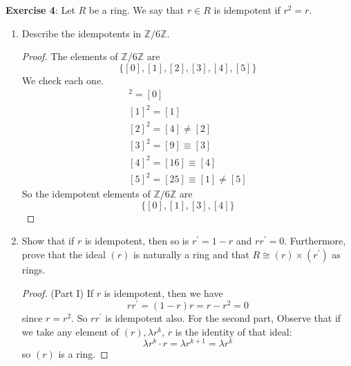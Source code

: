 \documentclass{article}
\begin{document}
\textbf{Exercise 4}: Let $R$ be a ring. We say that $r \in R$ is idempotent if $r^{2} = r$.
    \begin{enumerate}
        \item Describe the idempotents in $\mathbb{Z}/6\mathbb{Z}$.
            \begin{proof}
                The elements of $\mathbb{Z}/6\mathbb{Z}$ are 
                \begin{equation*}
                    \{[0], [1], [2], [3], [4], [5]\}
                \end{equation*}
                We check each one.
                \begin{gather*}
                    [0]^{2} = [0] \\
                    [1]^{2}  = [1] \\
                    [2]^{2} = [4] \neq [2] \\
                    [3]^{2} = [9] \equiv [3] \\
                    [4]^{2} = [16] \equiv [4] \\
                    [5]^{2} = [25] \equiv [1] \neq [5]
                \end{gather*}
                So the idempotent elements of $\mathbb{Z}/6\mathbb{Z}$ are 
                \begin{equation*}
                    \{[0], [1], [3], [4]\}
                \end{equation*}
            \end{proof}

        \item Show that if $r$ is idempotent, then so is $r^{\prime} = 1 - r$ and $rr^{\prime} = 0$. Furthermore, prove that the ideal $(r)$ is naturally a ring and that $R \cong (r) \times (r^{\prime})$ as rings.
            \begin{proof}
                (Part I) If $r$ is idempotent, then we have
                \begin{equation*}
                    rr^{\prime} = (1 - r)r = r - r^{2} = 0 
                \end{equation*}
                since $r = r^{2}$. So $rr^{\prime}$ is idempotent also. For the second part, Observe that if we take any element of $(r), \lambda r^{k}$, $r$ is the identity of that ideal:
                \begin{equation*}
                    \lambda r^{k} \cdot r = \lambda r^{k + 1} = \lambda r^{k}
                \end{equation*}
                so $(r)$ is a ring.


\end{proof}
\end{enumerate}
\end{document}
